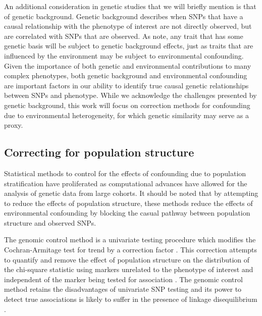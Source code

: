An additional consideration in genetic studies that we will briefly mention is that of genetic background. Genetic background describes when SNPs that have a causal relationship with the phenotype of interest are not directly observed, but are correlated with SNPs that are observed. As \cite{vilhjalmsson2012nature} note, any trait that has some genetic basis will be subject to genetic background effects, just as traits that are influenced by the environment may be subject to environmental confounding. Given the importance of both genetic and environmental contributions to many complex phenotypes, both genetic background and environmental confounding are important factors in our ability to identify true causal genetic relationships between SNPs and phenotype. While we acknowledge the challenges presented by genetic background, this work will focus on correction methods for confounding due to environmental heterogeneity, for which genetic similarity may serve as a proxy.


\subsection{Correcting for population structure}

Statistical methods to control for the effects of confounding due to population stratification have proliferated as computational advances have allowed for the analysis of genetic data from large cohorts. It should be noted that by attempting to reduce the effects of population structure, these methods reduce the effects of environmental confounding by blocking the casual pathway between population structure and observed SNPs.

The genomic control method is a univariate testing procedure which modifies the Cochran-Armitage test for trend by a correction factor . This correction attempts to quantify and remove the effect of population structure on the distribution of the chi-square statistic using markers unrelated to the phenotype of interest and independent of the marker being tested for association \cite{devlin1999genomic, bacanu2000power, wang2009testing}. The genomic control method retains the disadvantages of univariate SNP testing and its power to detect true associations is likely to suffer in the presence of linkage disequilibrium .  

